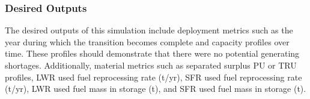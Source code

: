 \subsubsection{Desired Outputs}

The desired outputs of this simulation include deployment metrics such as the 
year during which the transition becomes complete and capacity profiles over 
time. These profiles should demonstrate that there were no potential generating 
shortages. Additionally, material metrics such as separated surplus PU or TRU 
profiles, LWR used fuel reprocessing rate (t/yr), SFR used fuel reprocessing 
rate (t/yr),  LWR used fuel mass in storage (t), and SFR used fuel mass in 
storage (t).

